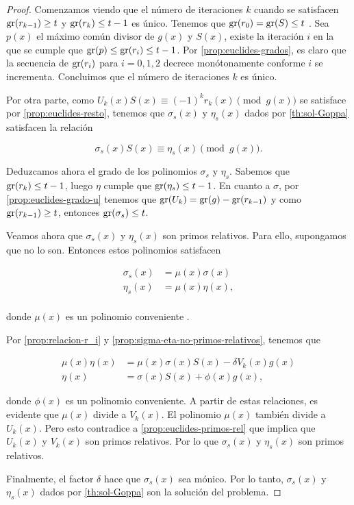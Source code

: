 \begin{proof}
    Comenzamos viendo que el número de iteraciones $k$ cuando se satisfacen $\operatorname{gr}(r_{k-1}) \geq t$ y $\operatorname{gr}(r_k) \leq t - 1$ es único. Tenemos que $\operatorname{gr}(r_0) = \operatorname{gr}(S) \leq t$ \cite[Lema 1]{Sugiyama_1975}. Sea $p(x)$ el máximo común divisor de $g(x)$ y $S(x)$, existe la iteración $i$ en la que se cumple que $\operatorname{gr}(p) \leq \operatorname{gr}(r_i) \leq t - 1$. Por \eqref{prop:euclides-grados}, es claro que la secuencia de $\operatorname{gr}(r_i)$ para $i = 0, 1, 2$ decrece monótonamente conforme $i$ se incrementa. Concluimos que el número de iteraciones $k$ es único.

    Por otra parte, como $U_k(x) S(x) \equiv (-1)^k r_k(x) \pmod{g(x)}$ se satisface por \eqref{prop:euclides-resto}, tenemos que $\sigma_s(x)$ y $\eta_s(x)$ dados por \eqref{th:sol-Goppa} satisfacen la relación

    $$\sigma_s(x) S(x) \equiv \eta_s(x) \pmod{g(x)}.$$

    Deduzcamos ahora el grado de los polinomios $\sigma_s$ y $\eta_s$. Sabemos que $\operatorname{gr}(r_k) \leq t - 1$, luego $\eta$ cumple que $\operatorname{gr}(\eta_s) \leq t - 1$. En cuanto a $\sigma$, por \eqref{prop:euclides-grado-u} tenemos que $\operatorname{gr}(U_k) = \operatorname{gr}(g) - \operatorname{gr}(r_{k-1})$ y como $\operatorname{gr}(r_{k-1}) \geq t$, entonces $\operatorname{gr}(\sigma_s) \leq t$.

    Veamos ahora que $\sigma_s(x)$ y $\eta_s(x)$ son primos relativos. Para ello, supongamos que no lo son. Entonces estos polinomios satisfacen

    \begin{equation}\label{prop:sigma-eta-no-primos-relativos}
        \begin{split}
            \sigma_s(x)     &=   \mu(x) \sigma(x)\\
            \eta_s(x)       &= \mu(x) \eta(x),\\
        \end{split}
    \end{equation}

    donde $\mu(x)$ es un polinomio conveniente \cite[Página 92]{Sugiyama_1975}.
    
    Por \eqref{prop:relacion-r_i} y \eqref{prop:sigma-eta-no-primos-relativos}, tenemos que

    \begin{align*}
        \mu(x) \eta(x)  &=   \mu(x) \sigma(x) S(x) - \delta V_k(x) g(x)\\
        \eta(x)         &=  \sigma(x) S(x) + \phi(x) g(x),
    \end{align*}
    
    donde $\phi(x)$ es un polinomio conveniente. A partir de estas relaciones, es evidente que $\mu(x)$ divide a $V_k(x)$. El polinomio $\mu(x)$ también divide a $U_k(x)$. Pero esto contradice a \eqref{prop:euclides-primos-rel} que implica que $U_k(x)$ y $V_k(x)$ son primos relativos. Por lo que $\sigma_s(x)$ y $\eta_s(x)$ son primos relativos.

    Finalmente, el factor $\delta$ hace que $\sigma_s(x)$ sea mónico. Por lo tanto, $\sigma_s(x)$ y $\eta_s(x)$ dados por \eqref{th:sol-Goppa} son la solución del problema.
\end{proof}


